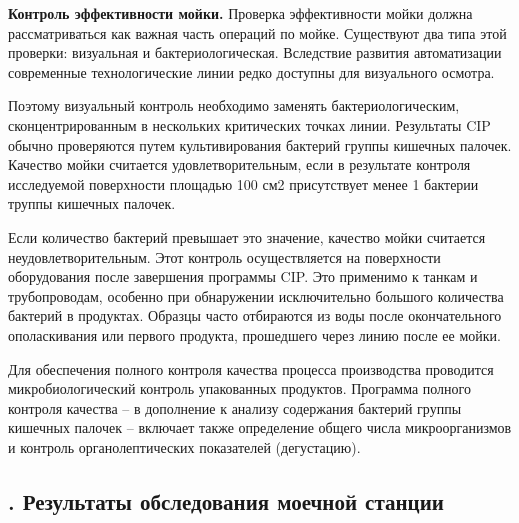 {\par \redline \textbf{Контроль эффективности мойки.} Проверка эффективности мойки должна рассматриваться как важная часть операций по мойке. Существуют два типа этой проверки: визуальная и бактериологическая. Вследствие развития автоматизации современные технологические линии редко доступны для визуального осмотра.

\par \redline Поэтому визуальный контроль необходимо заменять бактериологическим, сконцентрированным в нескольких критических точках линии. Результаты CIP обычно проверяются путем культивирования бактерий группы кишечных палочек. Качество мойки считается удовлетворительным, если в результате контроля исследуемой поверхности площадью 100 см2 присутствует менее 1 бактерии труппы кишечных палочек.

\par \redline Если количество бактерий превышает это значение, качество мойки считается неудовлетворительным. Этот контроль осуществляется на поверхности оборудования после завершения программы CIP. Это применимо к танкам и трубопроводам, особенно при обнаружении исключительно большого количества бактерий в продуктах. Образцы часто отбираются из воды после окончательного ополаскивания или первого продукта, прошедшего через линию после ее мойки.

\par \redline Для обеспечения полного контроля качества процесса производства проводится микробиологический контроль упакованных продуктов. Программа полного контроля качества {--} в дополнение к анализу содержания бактерий группы кишечных палочек {--} включает также определение общего числа микроорганизмов и контроль органолептических показателей (дегустацию).


\par
}

\subtitlespace

\subsection*{ 
  \gostTitleFont
  \redline
  \thechaptercntr .\thesubchaptercntr \spc
  Результаты обследования моечной станции
} \addtocounter{subchaptercntr}{1}

\subtitlespace


